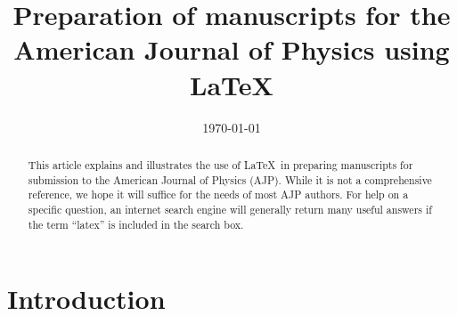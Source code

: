 \documentclass[prb,preprint]{revtex4-1}
\begin{document}

\title{Preparation of manuscripts for the American Journal of Physics
using \LaTeX}




\date{\today}

\begin{abstract}
This article explains and illustrates the use of \LaTeX\ in preparing manuscripts
for submission to the American Journal of Physics (AJP). While it is not a
comprehensive reference, we hope it will suffice for the needs of most
AJP authors.  For help on a specific question, an internet search engine will 
generally return many useful answers if the term ``latex'' is included in the 
search box.
\end{abstract}

\maketitle %


\section{Introduction} %
\end{document}
